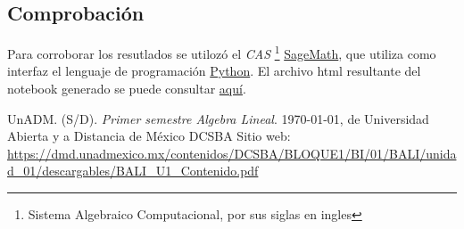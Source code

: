\documentclass[11pt]{article}
\begin{document}
	\subsection*{Comprobaci\'on}
	\par Para corroborar los resutlados se utiloz\'o el \textit{CAS} 
\footnote{Sistema Algebraico Computacional, por sus siglas en ingles} 
	\href{https://www.sagemath.org/}{SageMath}, que utiliza como interfaz el lenguaje de programaci\'on \href{https://www.python.org/}{Python}. El archivo html resultante del notebook generado se puede consultar \href{www.google.com}{aqu\'i}.



\newpage
\begin{thebibliography}{X}
	 UnADM. (S/D). \emph{Primer semestre Algebra Lineal}. \today, de Universidad Abierta y a Distancia de México \textbar{} DCSBA Sitio web: \url{https://dmd.unadmexico.mx/contenidos/DCSBA/BLOQUE1/BI/01/BALI/unidad_01/descargables/BALI_U1_Contenido.pdf}
\end{thebibliography}
\end{document}
